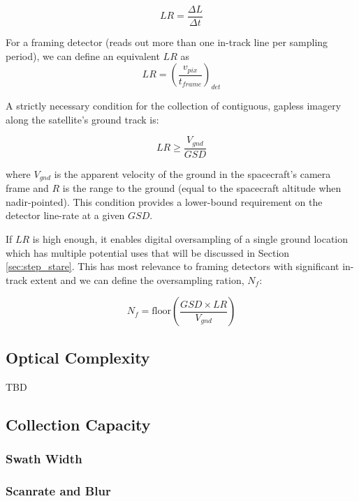 \documentclass[10pt,journal]{IEEEtran}  %
\begin{document}
$$LR = \frac{\Delta L}{\Delta t}$$

For a framing detector (reads out more than one in-track line per sampling period), we can define an equivalent $LR$ as
\begin{equation}
\label{eq:lr_framing}    
LR = \left(\frac{v_{pix}}{t_{frame}}\right)_{det}
\end{equation}

A strictly necessary condition for the collection of contiguous, gapless imagery along the satellite's ground track is:

\begin{equation}
    LR \geq\frac{V_{gnd}}{GSD}
\end{equation}

where $V_{gnd}$ is the apparent velocity of the ground in the spacecraft's camera frame and $R$ is the range to the ground (equal to the spacecraft altitude when nadir-pointed).  This condition provides a lower-bound requirement on the detector line-rate at a given $GSD$.  

If $LR$ is high enough, it enables digital oversampling of a single ground location which has multiple potential uses that will be discussed in Section \ref{sec:step_stare}.  This has most relevance to framing detectors with significant in-track extent and we can define the oversampling ration, $N_f$:

\begin{equation}
    N_f = \text{floor}\left(\frac{GSD \times LR}{V_{gnd}}\right)
\end{equation}

\subsection{Optical Complexity}
TBD


\subsection{Collection Capacity}
\label{sec:capacity}

\subsubsection{Swath Width}

\subsubsection{Scanrate and Blur}
\end{document}

